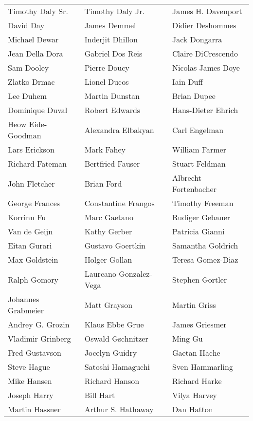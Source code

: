 \begin{tabular}{lll}
Timothy Daly Sr.       & Timothy Daly Jr.       & James H. Davenport\\
David Day              & James Demmel           & Didier Deshommes\\
Michael Dewar          & Inderjit Dhillon       & Jack Dongarra\\
Jean Della Dora        & Gabriel Dos Reis       & Claire DiCrescendo\\
Sam Dooley             & Pierre Doucy           & Nicolas James Doye\\
Zlatko Drmac           & Lionel Ducos           & Iain Duff\\
Lee Duhem              & Martin Dunstan         & Brian Dupee\\
Dominique Duval        & Robert Edwards         & Hans-Dieter Ehrich\\
Heow Eide-Goodman      & Alexandra Elbakyan     & Carl Engelman\\
Lars Erickson          & Mark Fahey             & William Farmer\\
Richard Fateman        & Bertfried Fauser       & Stuart Feldman\\
John Fletcher          & Brian Ford             & Albrecht Fortenbacher\\
George Frances         & Constantine Frangos    & Timothy Freeman\\
Korrinn Fu             & Marc Gaetano           & Rudiger Gebauer\\
Van de Geijn           & Kathy Gerber           & Patricia Gianni\\
Eitan Gurari           & Gustavo Goertkin       & Samantha Goldrich\\
Max Goldstein          & Holger Gollan          & Teresa Gomez-Diaz\\
Ralph Gomory           & Laureano Gonzalez-Vega & Stephen Gortler\\
Johannes Grabmeier     & Matt Grayson           & Martin Griss\\
Andrey G. Grozin       & Klaus Ebbe Grue        & James Griesmer\\
Vladimir Grinberg      & Oswald Gschnitzer      & Ming Gu\\
Fred Gustavson         & Jocelyn Guidry         & Gaetan Hache\\
Steve Hague            & Satoshi Hamaguchi      & Sven Hammarling\\
Mike Hansen            & Richard Hanson         & Richard Harke\\
Joseph Harry           & Bill Hart              & Vilya Harvey\\
Martin Hassner         & Arthur S. Hathaway     & Dan Hatton\\
\end{tabular}
\vfill
\newpage


